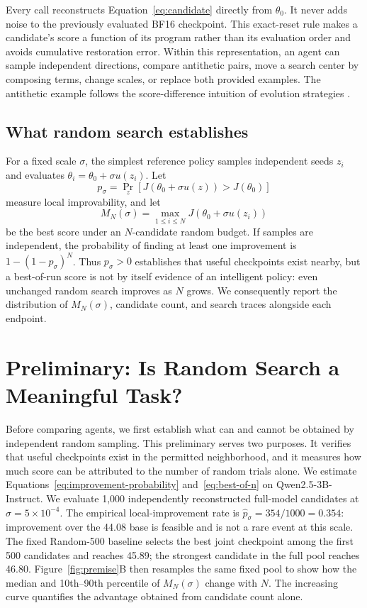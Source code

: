 \documentclass{article}
\newcommand{\score}{J}
\begin{document}
Every call reconstructs Equation~\ref{eq:candidate} directly from $\theta_0$. It never
adds noise to the previously evaluated BF16 checkpoint. This exact-reset rule makes a
candidate's score a function of its program rather than its evaluation order and avoids
cumulative restoration error. Within this representation, an agent can sample independent
directions, compare antithetic pairs, move a search center by composing terms, change
scales, or replace both provided examples. The antithetic example follows the
score-difference intuition of evolution strategies \citep{salimans2017es}.

\subsection{What random search establishes}

For a fixed scale $\sigma$, the simplest reference policy samples independent seeds
$z_i$ and evaluates $\theta_i=\theta_0+\sigma u(z_i)$. Let
\begin{equation}
    p_\sigma=\Pr_z[\score(\theta_0+\sigma u(z))>\score(\theta_0)]
    \label{eq:improvement-probability}
\end{equation}
measure local improvability, and let
\begin{equation}
    M_N(\sigma)=\max_{1\leq i\leq N}\score(\theta_0+\sigma u(z_i))
    \label{eq:best-of-n}
\end{equation}
be the best score under an $N$-candidate random budget. If samples are independent, the
probability of finding at least one improvement is
$1-(1-p_\sigma)^N$. Thus $p_\sigma>0$ establishes that useful checkpoints exist nearby,
but a best-of-run score is not by itself evidence of an intelligent policy: even unchanged
random search improves as $N$ grows. We consequently report the distribution of
$M_N(\sigma)$, candidate count, and search traces alongside each endpoint.

\section{Preliminary: Is Random Search a Meaningful Task?}

Before comparing agents, we first establish what can and cannot be obtained by independent
random sampling. This preliminary serves two purposes. It verifies that useful checkpoints
exist in the permitted neighborhood, and it measures how much score can be attributed to
the number of random trials alone. We estimate Equations~\ref{eq:improvement-probability}
and~\ref{eq:best-of-n} on Qwen2.5-3B-Instruct. We evaluate 1,000 independently reconstructed
full-model candidates at $\sigma=5\times10^{-4}$. The empirical local-improvement rate is
$\hat p_\sigma=354/1000=0.354$: improvement over the 44.08 base is feasible and is not a
rare event at this scale. The fixed Random-500 baseline selects the best joint checkpoint
among the first 500 candidates and reaches 45.89; the strongest candidate in the full pool
reaches 46.80. Figure~\ref{fig:premise}B
then resamples the same fixed pool to show how the median and 10th--90th percentile of
$M_N(\sigma)$ change with $N$. The increasing curve quantifies the advantage obtained from
candidate count alone.
\end{document}
